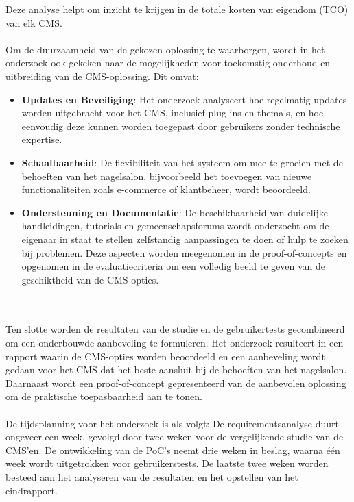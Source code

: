 Deze analyse helpt om inzicht te krijgen in de totale kosten van eigendom (TCO) van elk CMS.
\\ \\
Om de duurzaamheid van de gekozen oplossing te waarborgen, wordt in het onderzoek ook gekeken naar de mogelijkheden voor toekomstig onderhoud en uitbreiding van de CMS-oplossing. Dit omvat:
\begin{itemize}
    \item \textbf{Updates en Beveiliging}: Het onderzoek analyseert hoe regelmatig updates worden uitgebracht voor het CMS, inclusief plug-ins en thema’s, en hoe eenvoudig deze kunnen worden toegepast door gebruikers zonder technische expertise.
    \item \textbf{Schaalbaarheid}: De flexibiliteit van het systeem om mee te groeien met de behoeften van het nagelsalon, bijvoorbeeld het toevoegen van nieuwe functionaliteiten zoals e-commerce of klantbeheer, wordt beoordeeld.
    \item \textbf{Ondersteuning en Documentatie}: De beschikbaarheid van duidelijke handleidingen, tutorials en gemeenschapsforums wordt onderzocht om de eigenaar in staat te stellen zelfstandig aanpassingen te doen of hulp te zoeken bij problemen.
    Deze aspecten worden meegenomen in de proof-of-concepts en opgenomen in de evaluatiecriteria om een volledig beeld te geven van de geschiktheid van de CMS-opties.
\end{itemize}
\\ \\
Ten slotte worden de resultaten van de studie en de gebruikertests gecombineerd om een onderbouwde aanbeveling te formuleren. Het onderzoek resulteert in een rapport waarin de CMS-opties worden beoordeeld en een aanbeveling wordt gedaan voor het CMS dat het beste aansluit bij de behoeften van het nagelsalon. Daarnaast wordt een proof-of-concept gepresenteerd van de aanbevolen oplossing om de praktische toepasbaarheid aan te tonen.
\\ \\
De tijdsplanning voor het onderzoek is als volgt:
De requirementsanalyse duurt ongeveer een week, gevolgd door twee weken voor de vergelijkende studie van de CMS’en. De ontwikkeling van de PoC’s neemt drie weken in beslag, waarna één week wordt uitgetrokken voor gebruikerstests. De laatste twee weken worden besteed aan het analyseren van de resultaten en het opstellen van het eindrapport.
